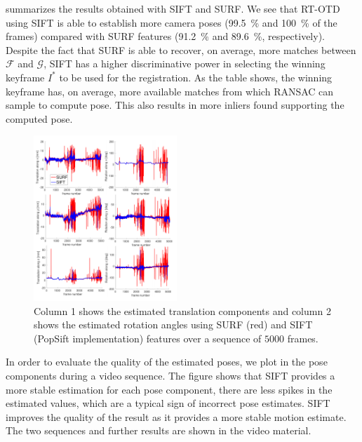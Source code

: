  summarizes the results obtained with SIFT and SURF. We see that RT-OTD using SIFT is able to establish more camera poses (\SI{99.5}{\percent} and \SI{100}{\percent} of the frames) compared with SURF features (\SI{91.2}{\percent} and \SI{89.6}{\percent}, respectively).
Despite the fact that SURF is able to recover, on average, more matches between $\mathcal{F}$ and $\mathcal{G}$, SIFT has a higher discriminative power in selecting the winning keyframe $I^*$ to be used for the registration. As the table shows, the winning keyframe has, on average, more available matches from which RANSAC can sample to compute pose. This also results in more inliers found supporting the computed pose.
\begin{figure}[t]
  \centering
  \includegraphics[width=0.48\textwidth]{./figs/Stability_Features.pdf}
\caption{Column 1 shows the estimated translation components and column 2 shows the estimated rotation angles using SURF (red) and SIFT (PopSift implementation) features over a sequence of $5000$ frames.}
\label{fig:SurfVsSift}
\vspace{-5mm}
\end{figure}

In order to evaluate the quality of the estimated poses, we plot in  the pose components during a video sequence. The figure shows that SIFT provides a more stable estimation for each pose component, \ie there are less spikes in the estimated values, which are a typical sign of incorrect pose estimates. SIFT improves the quality of the result as it provides a more stable motion estimate. 
The two sequences and further results are shown in the video material. 
